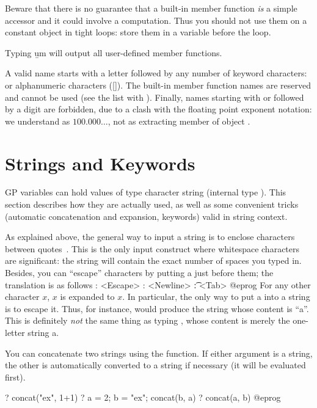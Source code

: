 Beware that there is no guarantee that a built-in member function \emph{is}
a simple accessor and it could involve a computation. Thus you should
not use them on a constant object in tight loops: store them in a variable
before the loop.

 Typing \b{um} will output all user-defined member functions.

 A valid name starts with a letter followed
by any number of keyword characters: \kbd{\_} or alphanumeric characters
([]). The built-in member function names are reserved and
cannot be used (see the list with ). Finally, names starting with
 or  followed by a digit are forbidden, due to a clash with
the floating point exponent notation: we understand  as
$100.000\dots$, not as extracting member  of object .

\section{Strings and Keywords}

\label{se:strings}

GP variables can hold values of type character string
(internal type ). This section describes how they are actually used,
as well as some convenient tricks (automatic concatenation and expansion,
keywords) valid in string context.

As explained above, the general way to input a string is to enclose
characters between quotes~. This is the only input construct where
whitespace characters are significant: the string will contain the exact
number of spaces you typed in. Besides, you can ``escape'' characters by
putting a \kbd{\bs} just before them; the translation is as follows
\bprog
   \e: <Escape>
   \n: <Newline>
   \t: <Tab>
@eprog
For any other character $x$, \b{$x$} is expanded to $x$. In particular, the
only way to put a  into a string is to escape it. Thus, for
instance,  would produce the string whose content is
``a''. This is definitely \emph{not} the same thing as typing ,
whose content is merely the one-letter string a.

You can concatenate two strings using the  function. If either
argument is a string, the other is automatically converted to a string if
necessary (it will be evaluated first).

\bprog
? concat("ex", 1+1)
? a = 2; b = "ex"; concat(b, a)
? concat(a, b)
@eprog

